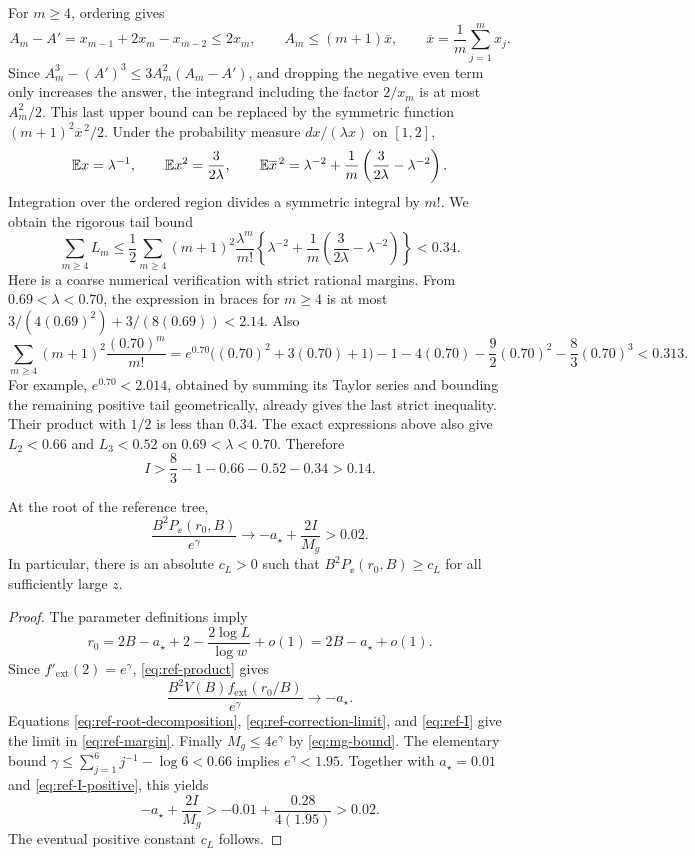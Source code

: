 For $m\geq4$, ordering gives
\[
 A_m-A'=x_{m-1}+2x_m-x_{m-2}\leq2x_m,\qquad
 A_m\leq(m+1)\overline x,\qquad
 \overline x=\frac1m\sum_{j=1}^m x_j.
\]
Since $A_m^3-(A')^3\leq3A_m^2(A_m-A')$, and dropping the negative
even term only increases the answer, the integrand including the
factor $2/x_m$ is at most $A_m^2/2$.  This last upper bound can be
replaced by the symmetric function $(m+1)^2\overline x^{\,2}/2$.
Under the probability measure $dx/(\lambda x)$ on $[1,2]$,
\[
 \mathbb E x=\lambda^{-1},\qquad \mathbb E x^2=\frac3{2\lambda},\qquad
 \mathbb E\overline x^{\,2}=
 \lambda^{-2}+\frac1m\left(\frac3{2\lambda}-\lambda^{-2}\right).
\]
Integration over the ordered region divides a symmetric integral by
$m!$.  We obtain the rigorous tail bound
\begin{equation}\label{eq:ref-loss-tail}
 \sum_{m\geq4}L_m\leq
 \frac12\sum_{m\geq4}(m+1)^2\frac{\lambda^m}{m!}
       \left\{\lambda^{-2}
          +\frac1m\left(\frac3{2\lambda}-\lambda^{-2}\right)\right\}
       <0.34.
\end{equation}
Here is a coarse numerical verification with strict rational margins.
From $0.69<\lambda<0.70$, the expression in braces for $m\geq4$ is at
most
$3/(4(0.69)^2)+3/(8(0.69))<2.14$.  Also
\[
 \sum_{m\geq4}(m+1)^2\frac{(0.70)^m}{m!}
  =e^{0.70}\bigl((0.70)^2+3(0.70)+1\bigr)
        -1-4(0.70)-\frac92(0.70)^2-\frac83(0.70)^3<0.313.
\]
For example, $e^{0.70}<2.014$, obtained by summing its Taylor series
and bounding the remaining positive tail geometrically, already gives
the last strict inequality.  Their product with $1/2$ is less than
$0.34$.  The exact expressions above also give $L_2<0.66$ and
$L_3<0.52$ on $0.69<\lambda<0.70$.  Therefore
\begin{equation}\label{eq:ref-I-positive}
 I>\frac83-1-0.66-0.52-0.34>0.14.
\end{equation}

\begin{proposition}\label{prop:reference-margin}
At the root of the reference tree,
\begin{equation}\label{eq:ref-margin}
 \frac{B^2P_\ee(r_0,B)}{e^\gamma}
       \longrightarrow -a_\star+\frac{2I}{M_g}>0.02.
\end{equation}
In particular, there is an absolute $c_L>0$ such that
$B^2P_\ee(r_0,B)\geq c_L$ for all sufficiently large $z$.
\end{proposition}

\begin{proof}
The parameter definitions imply
\[
 r_0=2B-a_\star+2-\frac{2\log L}{\log w}+o(1)
                  =2B-a_\star+o(1).
\]
Since $f'_{\mathrm{ext}}(2)=e^\gamma$, \eqref{eq:ref-product} gives
\[
 \frac{B^2V(B)f_{\mathrm{ext}}(r_0/B)}{e^\gamma}
                           \longrightarrow-a_\star.
\]
Equations \eqref{eq:ref-root-decomposition},
\eqref{eq:ref-correction-limit}, and \eqref{eq:ref-I} give the limit
in \eqref{eq:ref-margin}.  Finally $M_g\leq4e^\gamma$ by
\eqref{eq:mg-bound}.  The elementary bound
$\gamma\leq\sum_{j=1}^6j^{-1}-\log6<0.66$ implies $e^\gamma<1.95$.
Together with $a_\star=0.01$ and \eqref{eq:ref-I-positive}, this yields
\[
 -a_\star+\frac{2I}{M_g}
       >-0.01+\frac{0.28}{4(1.95)}>0.02.
\]
The eventual positive constant $c_L$ follows.
\end{proof}

